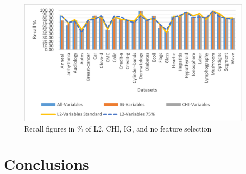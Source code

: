 \documentclass[review]{elsarticle}
\begin{document}
\begin{figure}[h]
	\centering
	\includegraphics[width=0.8\linewidth]{figs/fig_6b_recall_75.png}
	\caption[fig-6b-recall-75]{Recall figures in \% of L2, CHI, IG, and no feature selection  }
	\label{fig:fig-6b-recall-75}
\end{figure}


\section{Conclusions }
\end{document}
